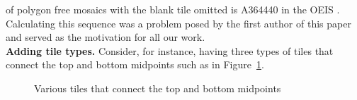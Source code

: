 \documentclass[12pt]{article}
\theoremstyle{plain}
\theoremstyle{remark}
\theoremstyle{definition}
\theoremstyle{remark}
\theoremstyle{definition}
\newcommand{\cellF}[4]{ \draw[thick] ( #1 , #2 ) rectangle ( #3 , #4 ); \draw[red, thick, densely dotted] (#3 * 0.5 + #1 * 0.5 , #2) -- (#3 * 0.5 + #1 * 0.5 , #4);}
\begin{document}
of polygon free mosaics with the blank tile omitted is A364440 in the OEIS \cite{oeis}. Calculating this sequence was a problem posed by the first author of this paper and served as the motivation for all our work.
\\

\noindent \textbf{Adding tile types.} Consider, for instance, having three types of tiles that connect the top and bottom midpoints such as in Figure~\ref{fig: various top bottom tiles}.

\begin{figure}[h!]
\begin{center}
\end{center}
\caption{Various tiles that connect the top and bottom midpoints}
\label{fig: various top bottom tiles}
\end{figure}
\end{document}
